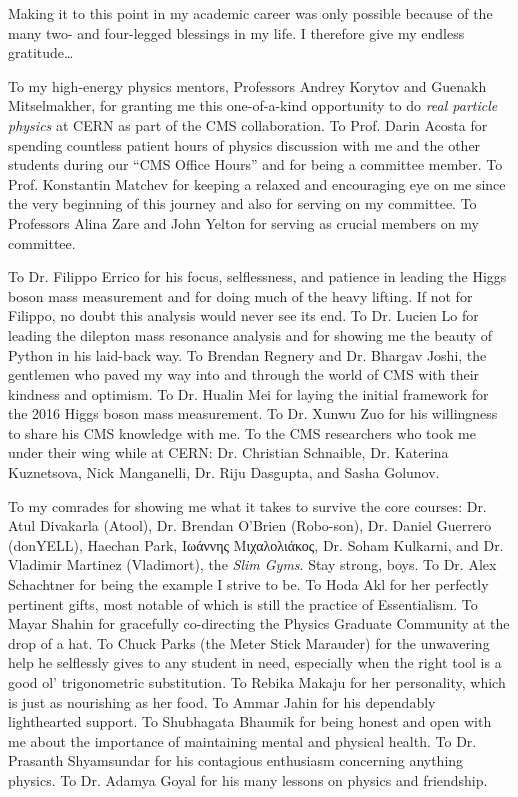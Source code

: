 
Making it to this point in my academic career was only possible because of the many two- and four-legged blessings in my life.
I therefore give my endless gratitude\ldots

To my high-energy physics mentors, Professors Andrey Korytov and Guenakh Mitselmakher, for granting me this one-of-a-kind opportunity to do \emph{real particle physics} at CERN as part of the CMS collaboration.
To Prof. Darin Acosta for spending countless patient hours of physics discussion with me and the other students during our ``CMS Office Hours'' and for being a committee member.
To Prof. Konstantin Matchev for keeping a relaxed and encouraging eye on me since the very beginning of this journey and also for serving on my committee.
To Professors Alina Zare and John Yelton for serving as crucial members on my committee.

To Dr. Filippo Errico for his focus, selflessness, and patience in leading the Higgs boson mass measurement and for doing much of the heavy lifting.
If not for Filippo, no doubt this analysis would never see its end.
To Dr. Lucien Lo for leading the dilepton mass resonance analysis and for showing me the beauty of Python in his laid-back way.
To Brendan Regnery and Dr. Bhargav Joshi, the gentlemen who paved my way into and through the world of CMS with their kindness and optimism.
To Dr. Hualin Mei for laying the initial framework for the 2016 Higgs boson mass measurement.
To Dr. Xunwu Zuo for his willingness to share his CMS knowledge with me.
To the CMS researchers who took me under their wing while at CERN: Dr. Christian Schnaible, Dr. Katerina Kuznetsova, Nick Manganelli, Dr. Riju Dasgupta, and Sasha Golunov.

To my comrades for showing me what it takes to survive the core courses: Dr. Atul Divakarla (Atool), Dr. Brendan O'Brien (Robo-son), Dr. Daniel Guerrero (donYELL), Haechan Park, \textgreek{Ιωάννης Μιχαλολιάκος}, Dr. Soham Kulkarni, and Dr. Vladimir Martinez (Vladimort), \ie the \emph{Slim Gyms}. Stay strong, boys.
To Dr. Alex Schachtner for being the example I strive to be.
To Hoda Akl for her perfectly pertinent gifts, most notable of which is still the practice of Essentialism.
To Mayar Shahin for gracefully co-directing the Physics Graduate Community at the drop of a hat.
To Chuck Parks (the Meter Stick Marauder) for the unwavering help he selflessly gives to any student in need, especially when the right tool is a good ol' trigonometric substitution.
To Rebika Makaju for her personality, which is just as nourishing as her food.
To Ammar Jahin for his dependably lighthearted support.
To Shubhagata Bhaumik for being honest and open with me about the importance of maintaining mental and physical health.
To Dr. Prasanth Shyamsundar for his contagious enthusiasm concerning anything physics.
To Dr. Adamya Goyal for his many lessons on physics and friendship.


